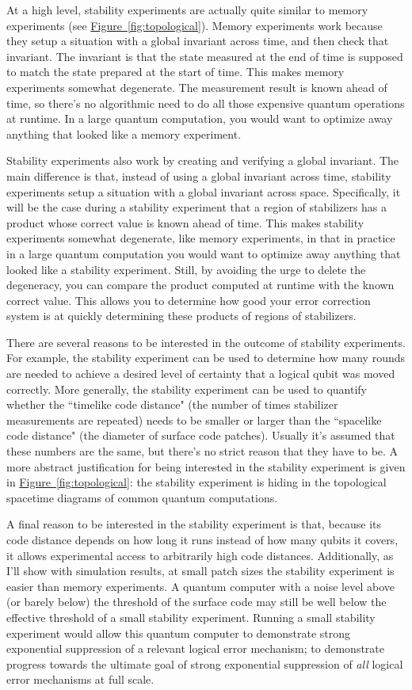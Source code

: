 \documentclass[onecolumn,unpublished,a4paper]{quantumarticle}
\theoremstyle{definition}
\theoremstyle{definition}
\theoremstyle{definition}
\newcommand{\fig}[1]{\hyperref[fig:#1]{Figure~\ref*{fig:#1}}}
\begin{document}
At a high level, stability experiments are actually quite similar to memory experiments (see \fig{topological}).
Memory experiments work because they setup a situation with a global invariant across time, and then check that invariant.
The invariant is that the state measured at the end of time is supposed to match the state prepared at the start of time.
This makes memory experiments somewhat degenerate.
The measurement result is known ahead of time, so there's no algorithmic need to do all those expensive quantum operations at runtime.
In a large quantum computation, you would want to optimize away anything that looked like a memory experiment.

Stability experiments also work by creating and verifying a global invariant.
The main difference is that, instead of using a global invariant across time, stability experiments setup a situation with a global invariant across space.
Specifically, it will be the case during a stability experiment that a region of stabilizers has a product whose correct value is known ahead of time.
This makes stability experiments somewhat degenerate, like memory experiments, in that in practice in a large quantum computation you would want to optimize away anything that looked like a stability experiment.
Still, by avoiding the urge to delete the degeneracy, you can compare the product computed at runtime with the known correct value.
This allows you to determine how good your error correction system is at quickly determining these products of regions of stabilizers.

There are several reasons to be interested in the outcome of stability experiments.
For example, the stability experiment can be used to determine how many rounds are needed to achieve a desired level of certainty that a logical qubit was moved correctly.
More generally, the stability experiment can be used to quantify whether the ``timelike code distance" (the number of times stabilizer measurements are repeated) needs to be smaller or larger than the ``spacelike code distance" (the diameter of surface code patches).
Usually it's assumed that these numbers are the same, but there's no strict reason that they have to be.
A more abstract justification for being interested in the stability experiment is given in \fig{topological}: the stability experiment is hiding in the topological spacetime diagrams of common quantum computations.

A final reason to be interested in the stability experiment is that, because its code distance depends on how long it runs instead of how many qubits it covers, it allows experimental access to arbitrarily high code distances.
Additionally, as I'll show with simulation results, at small patch sizes the stability experiment is easier than memory experiments.
A quantum computer with a noise level above (or barely below) the threshold of the surface code may still be well below the effective threshold of a small stability experiment.
Running a small stability experiment would allow this quantum computer to demonstrate strong exponential suppression of a relevant logical error mechanism; to demonstrate progress towards the ultimate goal of strong exponential suppression of \emph{all} logical error mechanisms at full scale.
\end{document}
